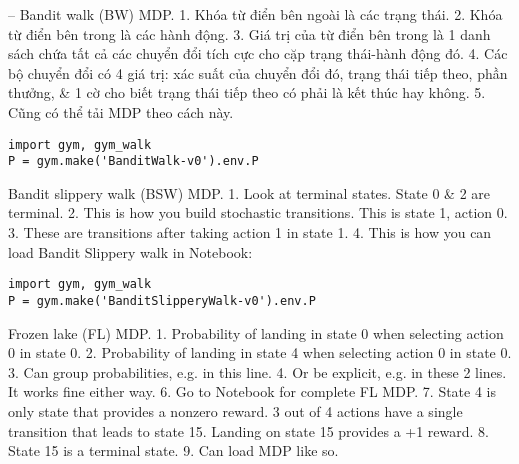 \documentclass{article}
\begin{document}
\begin{itemize}
\begin{itemize}
        -- {\sf Bandit walk (BW) MDP.} 1. Khóa từ điển bên ngoài là các trạng thái. 2. Khóa từ điển bên trong là các hành động. 3. Giá trị của từ điển bên trong là 1 danh sách chứa tất cả các chuyển đổi tích cực cho cặp trạng thái-hành động đó. 4. Các bộ chuyển đổi có 4 giá trị: xác suất của chuyển đổi đó, trạng thái tiếp theo, phần thưởng, \& 1 cờ cho biết trạng thái tiếp theo có phải là kết thúc hay không. 5. Cũng có thể tải MDP theo cách này.
        \begin{verbatim}
import gym, gym_walk
P = gym.make('BanditWalk-v0').env.P
        \end{verbatim}
        {\sf Bandit slippery walk (BSW) MDP.} 1. Look at terminal states. State 0 \& 2 are terminal. 2. This is how you build stochastic transitions. This is state 1, action 0. 3. These are transitions after taking action 1 in state 1. 4. This is how you can load Bandit Slippery walk in Notebook:
        \begin{verbatim}
import gym, gym_walk
P = gym.make('BanditSlipperyWalk-v0').env.P
        \end{verbatim}
        {\sf Frozen lake (FL) MDP.} 1. Probability of landing in state 0 when selecting action 0 in state 0. 2. Probability of landing in state 4 when selecting action 0 in state 0. 3. Can group probabilities, e.g. in this line. 4. Or be explicit, e.g. in these 2 lines. It works fine either way. 6. Go to Notebook for complete FL MDP. 7. State 4 is only state that provides a nonzero reward. 3 out of 4 actions have a single transition that leads to state 15. Landing on state 15 provides a +1 reward. 8. State 15 is a terminal state. 9. Can load MDP like so.


\end{itemize}
\end{itemize}
\end{document}
